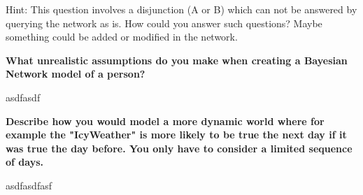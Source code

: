\documentclass[12pt,a4paper]{article}
\begin{document}
Hint: This question involves a disjunction (A or B) which can not be answered by querying the network as is. How could you answer such questions? Maybe something could be added or modified in the network.

\textbf{What unrealistic assumptions do you make when creating a Bayesian Network model of a person?}

asdfasdf

\textbf{Describe how you would model a more dynamic world where for example the "IcyWeather" is more likely to be true the next day if it was true the day before. You only have to consider a limited sequence of days.}

asdfasdfasf
\end{document}
